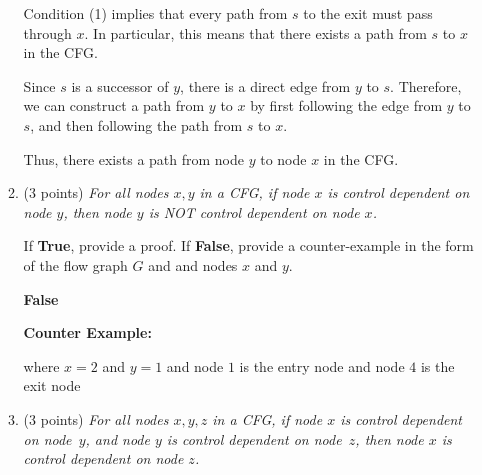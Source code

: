 \documentclass[12pt]{article}
\begin{document}
\begin{enumerate}
\begin{enumerate}
\begin{mdframed}
          Condition (1) implies that every path from $s$ to the exit must pass through $x$. In particular, this means that there exists a path from $s$ to $x$ in the CFG.

          Since $s$ is a successor of $y$, there is a direct edge from $y$ to $s$. Therefore, we can construct a path from $y$ to $x$ by first following the edge from $y$ to $s$, and then following the path from $s$ to $x$.

          Thus, there exists a path from node $y$ to node $x$ in the CFG.
        \end{mdframed}
      
        \item (3 points)
        \emph{For all nodes $x, y$ in a CFG, if node $x$ is control dependent on
        node $y$, then node $y$ is NOT control dependent on node $x$.}

        If \textbf{True}, provide a proof.
        If \textbf{False}, provide a counter-example in the form of the flow
        graph $G$ and and nodes $x$ and $y$.
        \begin{mdframed}
          \textbf{False}

          \textbf{Counter Example:}
          \begin{mdframed}

            where $x = 2$ and $y = 1$ and node $1$ is the entry node and node $4$ is the exit node
          \end{mdframed}
        \end{mdframed}
      
        \item (3 points) \emph{For all nodes $x, y, z$ in a CFG, if node $x$ is
        control dependent on node~$y$, and node $y$ is control dependent on
        node~$z$, then node $x$ is control dependent on node $z$.}


\end{enumerate}
\end{enumerate}
\end{document}

